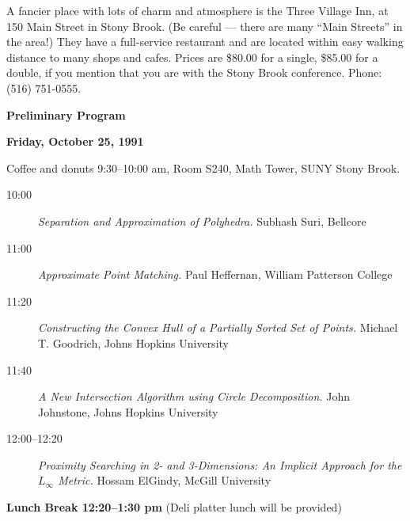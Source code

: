 A fancier place with lots of charm and atmosphere is the Three Village
Inn, at 150 Main Street in Stony Brook.  (Be careful --- there are
many ``Main Streets'' in the area!)  They have a full-service restaurant
and are located within easy walking distance to many shops and cafes.
Prices are \$80.00 for a single, \$85.00 for a double, if you mention
that you are with the Stony Brook conference.  Phone: (516) 751-0555.

\newpage



\begin{center}
 
{\normalsize\bf Preliminary Program}

\end{center}
\parskip=4pt
\parindent=0pt

{\normalsize\bf Friday, October 25, 1991}

Coffee and donuts 9:30--10:00 am, Room S240, Math Tower, SUNY Stony Brook.

\vskip 10pt

\begin{description}
\item[10:00]
{\it Separation and Approximation of Polyhedra.}
Subhash Suri,
{\sf Bellcore}

\item[11:00]
{\it Approximate Point Matching.}
Paul Heffernan,
{\sf William Patterson College}

\item[11:20]
{\it Constructing the Convex Hull of a Partially Sorted Set of Points.}
Michael T. Goodrich,
{\sf Johns Hopkins University}

\item[11:40]
{\it A New Intersection Algorithm using Circle Decomposition.}
John Johnstone,
{\sf Johns Hopkins University}

\item[12:00--12:20]
{\it Proximity Searching in 2- and 3-Dimensions: An Implicit Approach
for the $L_\infty$ Metric.}
Hossam ElGindy,
{\sf McGill University}
\end{description}

{\bf Lunch Break 12:20--1:30 pm}  (Deli platter lunch will be provided)

